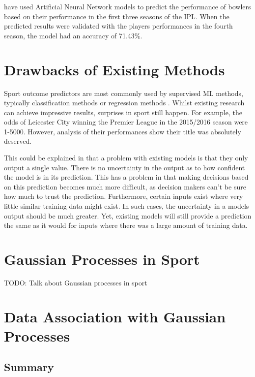 \documentclass[12pt,a4paper]{report}
\begin{document}
\citet{Saikia2012} have used Artificial Neural Network models to predict the performance of bowlers based on their performance in the first three seasons of the IPL. When the predicted results were validated with the players performances in the fourth season, the model had an accuracy of 71.43\%.

\section{Drawbacks of Existing Methods}

Sport outcome predictors are most commonly used by supervised ML methods, typically classification methods or regression methods \citep{horvat2020}. Whilst existing research can achieve impressive results, surprises in sport still happen. For example, the odds of Leicester City winning the Premier League in the 2015/2016 season were 1-5000. However, analysis of their performances show their title was absolutely deserved.

This could be explained in that a problem with existing models is that they only output a single value. There is no uncertainty in the output as to how confident the model is in its prediction. This has a problem in that making decisions based on this prediction becomes much more difficult, as decision makers can't be sure how much to trust the prediction. Furthermore, certain inputs exist where very little similar training data might exist. In such cases, the uncertainty in a models output should be much greater. Yet, existing models will still provide a prediction the same as it would for inputs where there was a large amount of training data.

\section{Gaussian Processes in Sport}

TODO: Talk about Gaussian processes in sport

\section{Data Association with Gaussian Processes}

\citep{Kaiser2018}
\citep{Lui2020}
\citep{Blumberg2020}

\subsection{Summary}
\end{document}
